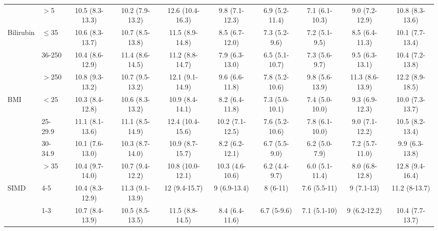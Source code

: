 \begin{sidewaystable}[p]
\begin{tabular}{|l l | cc cc cc cc |}
		                    & $>$5      & 10.5 (8.3-13.3) & 10.2 (7.9-13.2) & 12.6 (10.4-16.3) & 9.8 (7.1-12.3)  & 6.9 (5.2-11.4) & 7.1 (6.1-10.3) & 9.0 (7.2-12.9)  & 10.8 (8.3-13.6) \\
		Bilirubin           & $\leq$35  & 10.6 (8.3-13.7) & 10.7 (8.5-13.8) & 11.5 (8.9-14.8)  & 8.5 (6.7-12.0)  & 7.3 (5.2-9.6)  & 7.2 (5.1-9.5)  & 8.5 (6.4-11.3)  & 10.1 (7.7-13.4) \\
		                    & 36-250    & 10.4 (8.6-12.9) & 11.4 (8.6-14.5) & 11.2 (8.8-14.7)  & 7.9 (6.3-13.0)  & 6.5 (5.1-10.7) & 7.3 (5.6-9.7)  & 9.5 (6.3-13.1)  & 10.4 (7.2-13.8) \\
		                    & $>$250    & 10.8 (9.3-13.2) & 10.7 (9.5-13.2) & 12.1 (9.1-14.9)  & 9.6 (6.6-11.8)  & 7.8 (5.2-10.6) & 9.8 (5.6-13.9) & 11.3 (8.6-13.9) & 12.2 (8.9-18.5) \\
		BMI                 & $<25$     & 10.3 (8.4-12.8) & 10.6 (8.3-13.2) & 10.9 (8.4-14.1)  & 8.2 (6.4-11.8)  & 7.3 (5.0-10.1) & 7.4 (5.0-10.0) & 9.3 (6.9-12.3)  & 10.0 (7.3-13.7) \\
		                    & 25-29.9   & 11.1 (8.1-13.6) & 11.1 (8.5-14.9) & 12.4 (10.4-15.6) & 10.2 (7.1-12.5) & 7.6 (5.2-10.6) & 7.8 (6.1-10.0) & 9.0 (7.1-12.2)  & 10.5 (8.2-13.4) \\
		                    & 30-34.9   & 10.1 (7.6-13.0) & 10.3 (8.7-14.0) & 10.9 (8.7-15.7)  & 8.2 (6.2-12.1)  & 6.7 (5.5-9.0)  & 6.2 (5.0-7.9)  & 7.2 (5.7-11.0)  & 9.9 (6.3-13.8)  \\
		                    & $>$35     & 10.4 (9.7-14.0) & 10.7 (9.4-12.2) & 10.8 (10.0-12.1) & 10.3 (4.6-10.6) & 6.2 (4.4-9.7)  & 6.0 (5.1-11.4) & 8.0 (6.8-12.8)  & 12.8 (9.4-16.4) \\
		SIMD                & 4-5       & 10.4 (8.3-12.9) & 11.3 (9.1-13.9) & 12 (9.4-15.7)    &  9 (6.9-13.4)   & 8 (6-11)       &  7.6 (5.5-11)  & 9 (7.1-13)      &  11.2 (8-13.7)  \\
		                    & 1-3       & 10.7 (8.4-13.9) & 10.5 (8.5-13.5) & 11.5 (8.8-14.5)  & 8.4 (6.4-11.6)  & 6.7 (5-9.6)    &  7.1 (5.1-10)  & 9 (6.2-12.2)    & 10.4 (7.7-13.7) \\

\end{tabular}
\end{sidewaystable}
